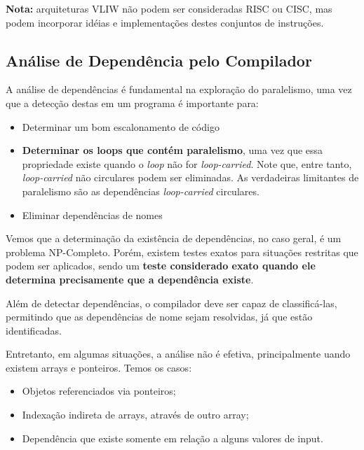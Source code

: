 \textbf{Nota:} arquiteturas VLIW não podem ser consideradas RISC ou CISC, mas podem incorporar idéias e implementações destes conjuntos de instruções.



\subsection{Análise de Dependência pelo Compilador}
A análise de dependências é fundamental na exploração do paralelismo, uma vez que a detecção destas em um programa é importante para:
\begin{itemize}
  \item Determinar um bom escalonamento de código

  \item \textbf{Determinar os loops que contém paralelismo}, uma vez que essa propriedade existe quando o \textit{loop} não for \textit{loop-carried}. Note que, entre tanto, \textit{loop-carried} não circulares podem ser eliminadas. As verdadeiras limitantes de paralelismo são as dependências \textit{loop-carried} circulares.

  \item Eliminar dependências de nomes
\end{itemize}

Vemos que a determinação da existência de dependências, no caso geral, é um problema NP-Completo. Porém, existem testes exatos para situações restritas que podem ser aplicados, sendo um \textbf{teste considerado exato quando ele determina precisamente que a dependência existe}.

Além de detectar dependências, o compilador deve ser capaz de classificá-las, permitindo que as dependências de nome sejam resolvidas, já que estão identificadas.

Entretanto, em algumas situações, a análise não é efetiva, principalmente uando existem arrays e ponteiros. Temos os casos:
\begin{itemize}
  \item Objetos referenciados via ponteiros;
  \item Indexação indireta de arrays, através de outro array;
  \item Dependência que existe somente em relação a alguns valores de input.
\end{itemize}
